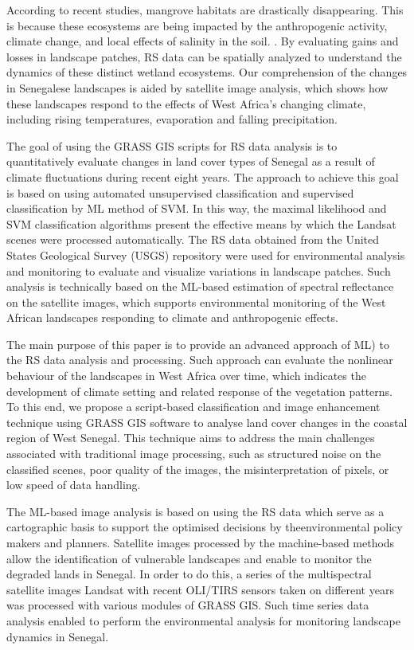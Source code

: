 \documentclass[earth,article,submit,pdftex,moreauthors]{Definitions/mdpi}
\begin{document}
{According to} recent studies, mangrove {habitats} are {drastically disappearing. {This is because }these} ecosystems are{ }{being impacted by} {the }anthropogenic {activity}, climate change, and local effects of salinity in {the} soil. \cite{ANDRIEU2020117963,Devaney}. {By evaluating gains and losses in landscape} patches, {RS} data {can be spatially analyzed} to{ }understand the dynamics of these {distinct} wetland ecosystems. {Our comprehension of the changes} in Senegalese landscapes {is aided by} satellite image analysis, {which{ }shows how these} landscapes {respond} to the effects of West Africa's changing climate, {including rising} temperatures{, }evaporation and {falling} precipitation. 

The goal of using the GRASS GIS scripts for {RS} data analysis is to quantitatively evaluate changes in land cover types of Senegal {as a result of} climate fluctuations {during} recent eight years{. The approach to achieve this goal is based on }using automated unsupervised classification and supervised classification by ML method of {SVM}. In this way, the maximal likelihood {and SVM }classification {algorithms present} the effective means by which the{ }Landsat scenes were processed automatically. The {RS} data obtained from the {United States Geological Survey (}USGS) repository {were} used for {environmental }analysis and{ }monitoring to {evaluate and visualize} variations in landscape patches{. Such analysis {is }technically based on the ML-based estimation of spectral reflectance on the satellite images{, which} supports environmental monitoring of the West African landscapes} responding to climate and anthropogenic effects{.} 

The main purpose of this paper is to provide an advanced approach of {ML)} to {the RS} data analysis and processing{. Such approach }can {evaluate} the nonlinear behaviour of {the }landscapes in West Africa over time{, which indicates} the development of climate setting and{ }related response of {the} vegetation patterns. {To this end, we} propose a script-based classification and image enhancement technique {using}{ }GRASS GIS{ software} to {analyse} land cover changes in the coastal region of West Senegal. {This} technique {aims} to address the main {challenges associated with} traditional image processing, {such as }structured noise on {the }classified scenes, poor quality {of the} images{, the} misinterpretation of pixels, {or} low speed of data handling. 

{The ML-based image analysis is based on using the }{RS} data {which serve} as a cartographic basis to support the{ }optimised decisions {by the}environmental policy makers and planners{. Satellite images processed by the machine-based methods allow }the identification of vulnerable landscapes and {enable} to monitor {the }degraded lands in Senegal. {In order to do this}, a series of the multispectral satellite images Landsat with recent OLI/TIRS sensors {taken on different years} was processed with various modules of GRASS GIS{. Such time series data analysis{ }enabled to perform {the }environmental } analysis for monitoring landscape dynamics in Senegal. 
\end{document}
